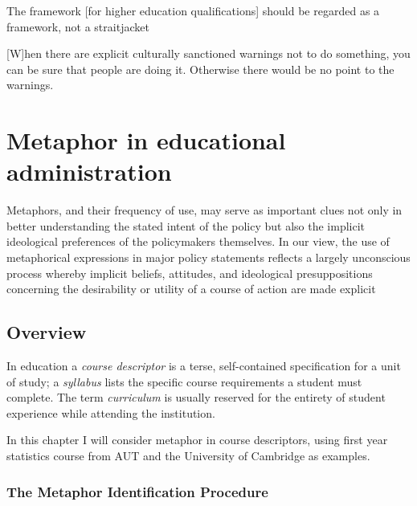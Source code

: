 \begin{singlespace}
\begin{savequote}[105mm]
The framework [for higher education qualifications] should be regarded
as a framework, not a straitjacket

[W]hen there are explicit culturally sanctioned warnings not to do
something, you can be sure that people are doing it.  Otherwise there
would be no point to the warnings.
\end{savequote}
\end{singlespace}

\chapter{Metaphor in educational administration}
\label{chapter3}

\begin{singlespace}
\setlength{\epigraphwidth}{.7\textwidth} %
\epigraph{Metaphors, and their frequency of use, may serve as
  important clues not only in better understanding the stated intent
  of the policy but also the implicit ideological preferences of the
  policymakers themselves.  In our view, the use of metaphorical
  expressions in major policy statements reflects a largely
  unconscious process whereby implicit beliefs, attitudes, and
  ideological presuppositions concerning the desirability or utility
  of a course of action are made explicit}{}
\end{singlespace}

\section{Overview}
\label{course_descriptor_discussion}
In education a \emph{course descriptor} is a terse, self-contained
specification for a unit of study; a \emph{syllabus} lists the
specific course requirements a student must complete.  The term
\emph{curriculum} is usually reserved for the entirety of student
experience while attending the institution.

In this chapter I will consider metaphor in course descriptors, using
first year statistics course from AUT and the University of Cambridge
as examples.

\subsection{The Metaphor Identification Procedure}

